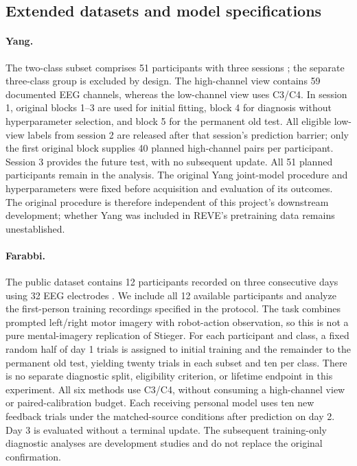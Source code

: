 \documentclass[11pt,a4paper]{article}
\begin{document}
\subsection{Extended datasets and model specifications}

\paragraph{Yang.}
The two-class subset comprises 51 participants with three sessions \cite{yang2025}; the separate three-class group is excluded by design. The high-channel view contains 59 documented EEG channels, whereas the low-channel view uses C3/C4. In session 1, original blocks 1--3 are used for initial fitting, block 4 for diagnosis without hyperparameter selection, and block 5 for the permanent old test. All eligible low-view labels from session 2 are released after that session's prediction barrier; only the first original block supplies 40 planned high-channel pairs per participant. Session 3 provides the future test, with no subsequent update. All 51 planned participants remain in the analysis. The original Yang joint-model procedure and hyperparameters were fixed before acquisition and evaluation of its outcomes. The original procedure is therefore independent of this project's downstream development; whether Yang was included in REVE's pretraining data remains unestablished.

\paragraph{Farabbi.}
The public dataset contains 12 participants recorded on three consecutive days using 32 EEG electrodes \cite{farabbi2020}. We include all 12 available participants and analyze the first-person training recordings specified in the protocol. The task combines prompted left/right motor imagery with robot-action observation, so this is not a pure mental-imagery replication of Stieger. For each participant and class, a fixed random half of day 1 trials is assigned to initial training and the remainder to the permanent old test, yielding twenty trials in each subset and ten per class. There is no separate diagnostic split, eligibility criterion, or lifetime endpoint in this experiment. All six methods use C3/C4, without consuming a high-channel view or paired-calibration budget. Each receiving personal model uses ten new feedback trials under the matched-source conditions after prediction on day 2. Day 3 is evaluated without a terminal update. The subsequent training-only diagnostic analyses are development studies and do not replace the original confirmation.
\end{document}
